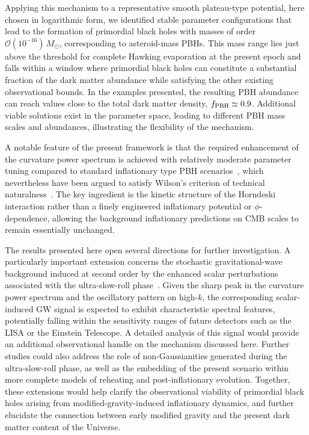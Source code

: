 \documentclass[nofootinbib,aps,a4paper,letterpaper,superscriptaddress,
twocolumn,times]{revtex4}
\renewcommand{\(}{\left(}
\renewcommand{\)}{\right)}
\renewcommand{\(}{\left(}
\renewcommand{\)}{\right)}
\renewcommand{\[}{\left[}
\renewcommand{\]}{\right]}
\begin{document}
Applying this mechanism to a representative smooth plateau-type potential, here 
chosen in logarithmic form, we identified stable parameter configurations that 
lead to the formation of primordial black holes with masses of order 
$\mathcal{O}(10^{-16})\,M_\odot$, corresponding to asteroid-mass PBHs. This mass 
range lies just above the threshold for complete Hawking evaporation at the 
present epoch and falls within a window where primordial black holes can 
constitute a substantial fraction of the dark matter abundance while satisfying 
the other existing observational bounds. In the 
examples presented, the resulting PBH abundance can reach values close to the 
total dark matter density, $f_{\rm PBH}\simeq 0.9$. Additional viable solutions 
exist in the parameter space, leading to different PBH mass scales and 
abundances, illustrating the flexibility of the mechanism.

A notable feature of the present framework is that the required enhancement of 
the curvature power spectrum is achieved with relatively moderate parameter 
tuning compared to standard inflationary type PBH scenarios~\cite{Cole:2023wyx}, which nevertheless have been argued to satisfy Wilson’s criterion of technical naturalness~\cite{Iovino:2025tcv}.
The key 
ingredient is the kinetic structure of the Horndeski interaction rather than a 
finely engineered inflationary potential or $\phi$-  dependence, allowing the background inflationary 
predictions on CMB scales to remain essentially unchanged. 


 
The results presented here open several directions for further investigation. A 
particularly important extension concerns the stochastic gravitational-wave 
background induced at second order by the enhanced scalar perturbations 
associated with the ultra-slow-roll phase~\cite{Domenech:2024drm}. Given the sharp peak in the curvature 
power spectrum and the oscillatory pattern on high-$k$, the corresponding scalar-induced GW signal is expected to exhibit characteristic spectral features, potentially falling 
within the sensitivity ranges of future detectors such as the LISA or the Einstein 
Telescope. A detailed analysis of this signal would provide an additional 
observational handle on the mechanism discussed here. Further studies could also 
address the role of non-Gaussianities   generated during the ultra-slow-roll 
phase, as well as the embedding of the present scenario within more complete 
models of reheating and post-inflationary evolution. Together, these extensions 
would help clarify the observational viability of primordial black holes arising 
from modified-gravity-induced inflationary dynamics, and further elucidate the 
connection between early modified gravity and the present dark matter 
content of 
the Universe.
\end{document}
